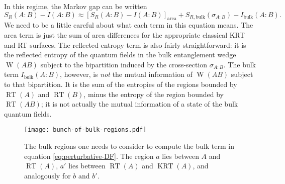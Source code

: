 \documentclass[a4paper,11pt]{article}
\newcommand{\RT}{\operatorname{RT}}
\newcommand{\KRT}{\operatorname{KRT}}
\newcommand{\W}{\operatorname{W}}
\begin{document}
In this regime, the Markov gap can be written
\begin{equation} \label{eq:perturbative-DF}
    S_R(A:B) - I(A:B)
        \approx [S_R(A:B) - I(A:B)]_{\text{area}} + S_{R, \text{bulk}}(\sigma_{A:B})
                - I_{\text{bulk}}(A:B).
\end{equation}
We need to be a little careful about what each term in this equation means. The area term is just the sum of area differences for the appropriate classical KRT and RT surfaces. The reflected entropy term is also fairly straightforward: it is the reflected entropy of the quantum fields in the bulk entanglement wedge $\W(AB)$ subject to the bipartition induced by the cross-section $\sigma_{A:B}.$ The bulk term $I_{\text{bulk}}(A:B)$, however, is \emph{not} the mutual information of $\W(AB)$ subject to that bipartition. It is the sum of the entropies of the regions bounded by $\RT(A)$ and $\RT(B)$, minus the entropy of the region bounded by $\RT(AB)$; it is not actually the mutual information of a state of the bulk quantum fields.

\begin{figure}
    \centering
    \texttt{[image: bunch-of-bulk-regions.pdf]}
    \caption{The bulk regions one needs to consider to compute the bulk term in equation \eqref{eq:perturbative-DF}. The region $a$ lies between $A$ and $\RT(A)$, $a'$ lies between $\RT(A)$ and $\KRT(A)$, and analogously for $b$ and $b'.$}
    \label{fig:bunch-of-bulk-regions}
\end{figure}
\end{document}
